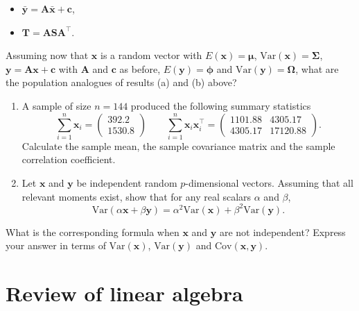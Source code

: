 \documentclass[]{book}
\providecommand{\tightlist}{%
  \setlength{\itemsep}{0pt}\setlength{\parskip}{0pt}}
\theoremstyle{definition}
\theoremstyle{definition}
\theoremstyle{definition}
\theoremstyle{remark}
\begin{document}
\begin{itemize}
\tightlist
\item
  \(\bar{\boldsymbol y} = \boldsymbol A\bar{\boldsymbol x} + \boldsymbol c\),
\item
  \(\boldsymbol T= \boldsymbol A\boldsymbol S\boldsymbol A^\top\).
\end{itemize}

Assuming now that \(\boldsymbol x\) is a random vector with \(E(\boldsymbol x)=\boldsymbol \mu\), \(\text{Var}(\boldsymbol x)=\boldsymbol \Sigma\), \(\boldsymbol y=\boldsymbol A\boldsymbol x+\boldsymbol c\) with \(\boldsymbol A\) and \(\boldsymbol c\) as before, \(E(\boldsymbol y)={\pmb \phi}\) and \(\text{Var}(\boldsymbol y)={\pmb \Omega}\), what are the population analogues of results (a) and (b) above?

\begin{enumerate}
\def\labelenumi{\arabic{enumi}.}
\setcounter{enumi}{2}
\item
  A sample of size \(n=144\) produced the following summary statistics
  \[ \sum_{i=1}^n \boldsymbol x_i = \begin{pmatrix} 392.2 \\ 1530.8 \end{pmatrix} \qquad \sum_{i=1}^n \boldsymbol x_i \boldsymbol x_i^\top = \begin{pmatrix} 1101.88 & 4305.17 \\ 4305.17 & 17120.88 \end{pmatrix}.\]
  Calculate the sample mean, the sample covariance matrix and the sample correlation coefficient.
\item
  Let \(\boldsymbol x\) and \(\boldsymbol y\) be independent random \(p\)-dimensional vectors. Assuming that all relevant moments exist, show that for any real scalars \(\alpha\) and \(\beta\),
  \[\text{Var}(\alpha \boldsymbol x+ \beta \boldsymbol y) = \alpha^2 \text{Var}(\boldsymbol x) + \beta^2 \text{Var}(\boldsymbol y).\]
\end{enumerate}

What is the corresponding formula when \(\boldsymbol x\) and \(\boldsymbol y\) are not independent? Express your answer in terms of \(\text{Var}(\boldsymbol x)\), \(\text{Var}(\boldsymbol y)\) and \(\text{Cov}(\boldsymbol x, \boldsymbol y)\).

\hypertarget{linalg-prelim}{%
\chapter{Review of linear algebra}\label{linalg-prelim}}
\end{document}

